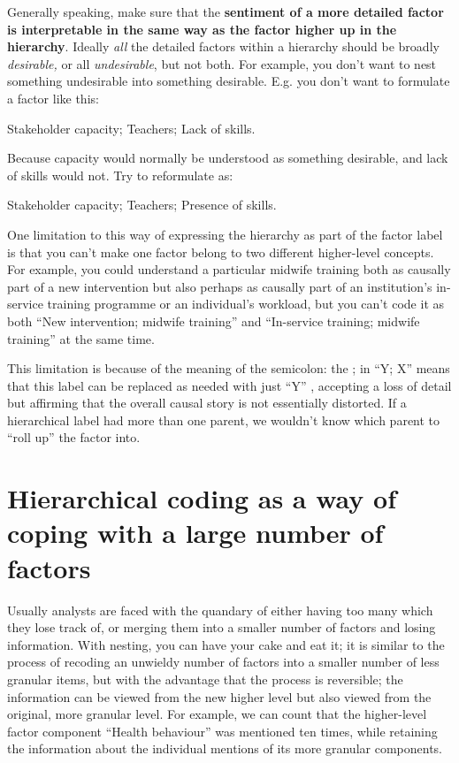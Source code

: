 \documentclass[
]{book}
\begin{document}
Generally speaking, make sure that the \textbf{sentiment of a more detailed factor is interpretable in the same way as the factor higher up in the hierarchy}. Ideally \emph{all} the detailed factors within a hierarchy should be broadly \emph{desirable,} or all \emph{undesirable}, but not both. For example, you don't want to nest something undesirable into something desirable. E.g. you don't want to formulate a factor like this:

Stakeholder capacity; Teachers; Lack of skills.

Because capacity would normally be understood as something desirable, and lack of skills would not. Try to reformulate as:

Stakeholder capacity; Teachers; Presence of skills.

One limitation to this way of expressing the hierarchy as part of the factor label is that you can't make one factor belong to two different higher-level concepts. For example, you could understand a particular midwife training both as causally part of a new intervention but also perhaps as causally part of an institution's in-service training programme or an individual's workload, but you can't code it as both ``New intervention; midwife training'' and ``In-service training; midwife training'' at the same time.

This limitation is because of the meaning of the semicolon: the ; in ``Y; X'' means that this label can be replaced as needed with just ``Y'' , accepting a loss of detail but affirming that the overall causal story is not essentially distorted. If a hierarchical label had more than one parent, we wouldn't know which parent to ``roll up'' the factor into.

\hypertarget{hierarchical-coding-as-a-way-of-coping-with-a-large-number-of-factors}{%
\section{Hierarchical coding as a way of coping with a large number of factors}\label{hierarchical-coding-as-a-way-of-coping-with-a-large-number-of-factors}}

Usually analysts are faced with the quandary of either having too many which they lose track of, or merging them into a smaller number of factors and losing information. With nesting, you can have your cake and eat it; it is similar to the process of recoding an unwieldy number of factors into a smaller number of less granular items, but with the advantage that the process is reversible; the information can be viewed from the new higher level but also viewed from the original, more granular level. For example, we can count that the higher-level factor component ``Health behaviour'' was mentioned ten times, while retaining the information about the individual mentions of its more granular components.
\end{document}
